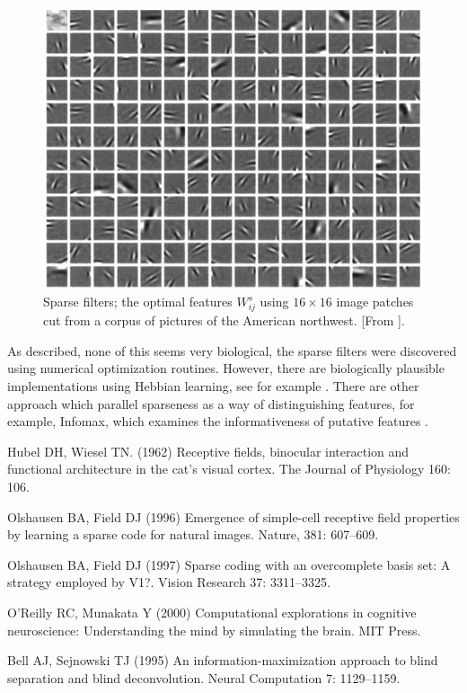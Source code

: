 \documentclass[11pt,a4paper]{scrartcl}
\begin{document}
\begin{figure}
\begin{center}
\includegraphics[width=12cm]{edges.png}
\end{center}
\caption{Sparse filters; the optimal features $W^s_{ij}$ using
  $16\times 16$ image patches cut from a corpus of pictures of the
  American northwest. [From \cite{OlshausenField1996a}].\label{fig:edges}}
\end{figure}

As described, none of this seems very biological, the sparse filters
were discovered using numerical optimization routines. However, there
are biologically plausible implementations using Hebbian learning, see
for example \cite{OReillyMunakata2000a}. There are other approach
which parallel sparseness as a way of distinguishing features, for
example, Infomax, which examines the informativeness of putative features \cite{BellSejnowski1995a}.


\begin{thebibliography}{10}

 Hubel DH, Wiesel TN. (1962) Receptive
  fields, binocular interaction and functional architecture in the
  cat's visual cortex.  \newblock The Journal of Physiology 160: 106.

Olshausen BA, Field DJ (1996) Emergence of simple-cell receptive field properties by learning a sparse code for natural images. 
\newblock Nature, 381: 607--609.

Olshausen BA, Field DJ (1997) Sparse coding with an overcomplete basis set: A strategy employed by V1?. 
\newblock Vision Research 37: 3311--3325.

O'Reilly RC, Munakata Y (2000) Computational explorations in cognitive neuroscience: Understanding the mind by simulating the brain. 
\newblock MIT Press.

Bell AJ, Sejnowski TJ (1995) An information-maximization approach to blind separation and blind deconvolution. 
\newblock Neural Computation 7: 1129--1159.



\end{thebibliography}
\end{document}
